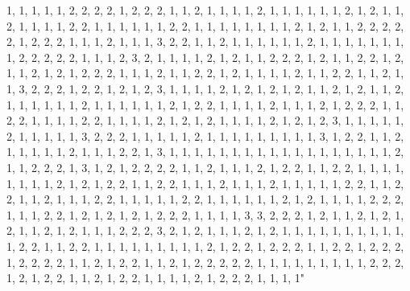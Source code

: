 \documentclass[
]{article}
\begin{document}
\begin{Schunk}
\begin{Soutput}
1, 1, 1, 1, 1, 2, 2, 2, 2, 1, 2, 2, 2, 1, 1, 2, 1, 1, 1, 1, 2, 1, 1, 1, 1, 1, 1, 2, 1, 2, 1, 1, 2, 1, 1, 1, 1, 2, 2, 1, 1, 1, 1, 1, 1, 2, 2, 1, 1, 1, 1, 1, 1, 1, 1, 2, 1, 2, 1, 1, 2, 2, 2, 2, 2, 1, 2, 2, 2, 1, 1, 1, 2, 1, 1, 1, 3, 2, 2, 1, 1, 2, 1, 1, 1, 1, 1, 1, 2, 1, 1, 1, 1, 1, 1, 1, 1, 2, 2, 2, 2, 2, 1, 1, 1, 2, 3, 2, 1, 1, 1, 1, 2, 1, 2, 1, 1, 2, 2, 2, 1, 2, 1, 1, 2, 2, 1, 2, 1, 1, 2, 1, 2, 1, 2, 2, 2, 1, 1, 1, 2, 1, 1, 2, 2, 1, 2, 1, 1, 1, 1, 2, 1, 1, 2, 2, 1, 1, 2, 1, 1, 3, 2, 2, 2, 1, 2, 2, 1, 2, 1, 2, 3, 1, 1, 1, 1, 2, 1, 2, 1, 2, 1, 2, 1, 1, 2, 1, 2, 1, 1, 2, 1, 1, 1, 1, 1, 1, 2, 1, 1, 1, 1, 1, 1, 2, 1, 2, 2, 1, 1, 1, 1, 2, 1, 1, 1, 2, 1, 2, 2, 2, 1, 1, 2, 2, 1, 1, 1, 1, 2, 2, 1, 1, 1, 1, 2, 1, 2, 1, 2, 1, 1, 1, 1, 2, 1, 2, 1, 2, 3, 1, 1, 1, 1, 1, 2, 1, 1, 1, 1, 1, 3, 2, 2, 2, 1, 1, 1, 1, 1, 2, 1, 1, 1, 1, 1, 1, 1, 1, 1, 3, 1, 2, 2, 1, 1, 2, 1, 1, 1, 1, 1, 2, 1, 1, 1, 2, 2, 1, 3, 1, 1, 1, 1, 1, 1, 1, 1, 1, 1, 1, 1, 1, 1, 1, 1, 1, 1, 2, 1, 1, 2, 2, 2, 1, 3, 1, 2, 1, 2, 2, 2, 2, 1, 1, 2, 1, 1, 1, 2, 1, 2, 2, 1, 1, 2, 2, 1, 1, 1, 1, 1, 1, 1, 1, 2, 1, 2, 1, 2, 2, 1, 1, 2, 2, 1, 1, 1, 2, 1, 1, 1, 2, 1, 1, 1, 1, 1, 2, 2, 1, 1, 2, 2, 1, 1, 2, 1, 1, 1, 2, 2, 1, 1, 1, 1, 1, 2, 2, 1, 1, 1, 1, 1, 1, 2, 1, 2, 1, 1, 1, 1, 2, 2, 2, 1, 1, 1, 2, 2, 1, 2, 1, 2, 1, 2, 1, 2, 2, 2, 1, 1, 1, 1, 3, 3, 2, 2, 2, 1, 2, 1, 1, 2, 1, 2, 1, 2, 1, 1, 2, 1, 2, 1, 1, 1, 2, 2, 2, 3, 2, 1, 2, 1, 1, 1, 2, 1, 2, 1, 1, 1, 1, 1, 1, 1, 1, 1, 1, 1, 2, 2, 1, 1, 2, 2, 1, 1, 1, 1, 1, 1, 1, 1, 1, 2, 1, 2, 2, 1, 2, 2, 2, 1, 1, 2, 2, 1, 2, 2, 2, 1, 2, 2, 2, 2, 1, 1, 2, 1, 2, 2, 1, 1, 2, 1, 2, 2, 2, 2, 2, 1, 1, 1, 1, 1, 1, 1, 1, 1, 2, 2, 2, 1, 2, 1, 2, 2, 1, 1, 2, 1, 2, 2, 1, 1, 1, 1, 2, 1, 2, 2, 2, 1, 1, 1, 1" 

\end{Soutput}
\end{Schunk}
\end{document}
